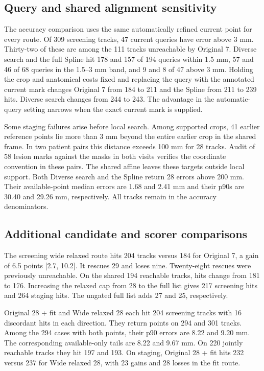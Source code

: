 \subsection{Query and shared alignment sensitivity}
The accuracy comparison uses the same automatically refined current point for every route. Of 309 screening tracks, 47 current queries have error above 3 mm. Thirty-two of these are among the 111 tracks unreachable by Original 7. Diverse search and the full Spline hit 178 and 157 of 194 queries within 1.5 mm, 57 and 46 of 68 queries in the 1.5--3 mm band, and 9 and 8 of 47 above 3 mm. Holding the crop and anatomical costs fixed and replacing the query with the annotated current mark changes Original 7 from 184 to 211 and the Spline from 211 to 239 hits. Diverse search changes from 244 to 243. The advantage in the automatic-query setting narrows when the exact current mark is supplied.

Some staging failures arise before local search. Among supported crops, 41 earlier reference points lie more than 3 mm beyond the entire earlier crop in the shared frame. In two patient pairs this distance exceeds 100 mm for 28 tracks. Audit of 58 lesion marks against the masks in both visits verifies the coordinate convention in these pairs. The shared affine leaves these targets outside local support. Both Diverse search and the Spline return 28 errors above 200 mm. Their available-point median errors are 1.68 and 2.41 mm and their p90s are 30.40 and 29.26 mm, respectively. All tracks remain in the accuracy denominators.
\subsection{Additional candidate and scorer comparisons}
The screening wide relaxed route hits 204 tracks versus 184 for Original 7, a gain of 6.5 points [2.7, 10.2]. It rescues 29 and loses nine. Twenty-eight rescues were previously unreachable. On the shared 194 reachable tracks, hits change from 181 to 176. Increasing the relaxed cap from 28 to the full list gives 217 screening hits and 264 staging hits. The ungated full list adds 27 and 25, respectively.

Original 28 + fit and Wide relaxed 28 each hit 204 screening tracks with 16 discordant hits in each direction. They return points on 294 and 301 tracks. Among the 294 cases with both points, their p90 errors are 8.22 and 9.20 mm. The corresponding available-only tails are 8.22 and 9.67 mm. On 220 jointly reachable tracks they hit 197 and 193. On staging, Original 28 + fit hits 232 versus 237 for Wide relaxed 28, with 23 gains and 28 losses in the fit route.

